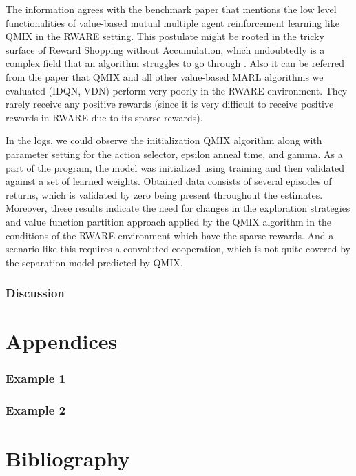 \documentclass[11pt]{article}
\begin{document}
The information agrees with the benchmark paper that mentions the low level functionalities of value-based mutual multiple agent reinforcement learning like QMIX in the RWARE setting. This postulate might be rooted in the tricky surface of Reward Shopping without Accumulation, which undoubtedly is a complex field that an algorithm struggles to go through \cite{papoudakis2020benchmarking}. Also it can be referred from the paper  that  QMIX and all other value-based MARL algorithms we evaluated (IDQN, VDN) perform very poorly in the RWARE environment. They rarely receive any positive rewards (since it is very difficult to receive positive rewards in RWARE due to its sparse rewards).

In the logs, we could observe the initialization QMIX algorithm along with parameter setting for the action selector, epsilon anneal time, and gamma. As a part of the program, the model was initialized using training and then validated against a set of learned weights.
Obtained data consists of several episodes of returns, which is validated by zero being present throughout the estimates. Moreover, these results indicate the need for changes in the exploration strategies and value function partition approach applied by the QMIX algorithm in the conditions of the RWARE environment which have the sparse rewards. And a scenario like this requires a convoluted cooperation, which is not quite covered by the separation model predicted by QMIX.


\section{Discussion}\label{discussion}









\newpage
\appendix
\renewcommand{\thesection}{\Alph{section}}
\renewcommand{\thesubsection}{\roman{subsection}}
\renewcommand{\theequation}{A-\arabic{equation}}

\part*{Appendices}


\section{Example 1}

\section{Example 2}


\newpage
\part*{Bibliography}


\end{document}
